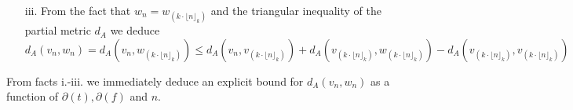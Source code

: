 \begin{example}
\begin{itemize}
\item[iii.] From the fact that $w_{n}=w_{(k\cdot \lfloor n\rfloor_{k})}$ and the triangular inequality of the partial metric $d_{A}$ we deduce  
$d_{A}(v_{n}, w_{n})=
d_{A}(v_{n},w_{(k\cdot \lfloor n\rfloor_{k})}) \leq
d_{A}(v_{n}, v_{(k\cdot \lfloor n\rfloor_{k})})+
d_{A}(v_{(k\cdot \lfloor n\rfloor_{k})}, w_{(k\cdot \lfloor n\rfloor_{k})})-
d_{A}(v_{(k\cdot \lfloor n\rfloor_{k})},v_{(k\cdot \lfloor n\rfloor_{k})} )$


\end{itemize}

From facts i.-iii. we immediately deduce an explicit bound for $d_{A}(v_{n},w_{n}    )$ as a function of $\partial(t), \partial(f)$ and $n$. 

\end{example}

%

%
%
%

